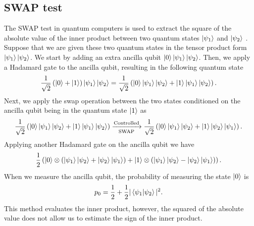 \documentclass[10pt]{article}
\begin{document}
	\subsection{\label{app: swap}SWAP test}
	The SWAP test in quantum computers is used to extract the square of the absolute value of the inner product between two quantum states $\ket{\psi_1}$ and $\ket{\psi_2}$ \citep{Schuld2021QML}. Suppose that we are given these two quantum states in the tensor product form $\ket{\psi_1}\ket{\psi_2}$. We start by adding an extra ancilla qubit $\ket{0}\ket{\psi_1}\ket{\psi_2}$. Then, we apply a Hadamard gate to the ancilla qubit, resulting in the following quantum state
	\begin{equation}
		\frac{1}{\sqrt{2}}\left(\ket{0}+\ket{1}\right)\ket{\psi_1}\ket{\psi_2}=\frac{1}{\sqrt{2}}\left(\ket{0}\ket{\psi_1}\ket{\psi_2}+\ket{1}\ket{\psi_1}\ket{\psi_2}\right).
	\end{equation}
	Next, we apply the swap operation between the two states conditioned on the ancilla qubit being in the quantum state $\ket{1}$ as
	\begin{equation}
		\frac{1}{\sqrt{2}}\left(\ket{0}\ket{\psi_1}\ket{\psi_2}+\ket{1}\ket{\psi_1}\ket{\psi_2}\right) \xrightarrow[\text{SWAP}]{\text{Controlled}}     \frac{1}{\sqrt{2}}\left(\ket{0}\ket{\psi_1}\ket{\psi_2}+\ket{1}\ket{\psi_2}\ket{\psi_1}\right) .
	\end{equation}
	Applying another Hadamard gate on the ancilla qubit we have
	\begin{equation}
		\frac{1}{2}\left(\ket{0}\otimes\left(\ket{\psi_1}\ket{\psi_2}+\ket{\psi_2}\ket{\psi_1}\right)+\ket{1}\otimes\left(\ket{\psi_1}\ket{\psi_2}-\ket{\psi_2}\ket{\psi_1}\right)\right).
	\end{equation}
	When we measure the ancilla qubit, the probability of measuring the state $\ket{0}$ is
	\begin{equation}
		p_{0}=\frac{1}{2}+\frac{1}{2}|\braket{\psi_1|\psi_2}|^{2}.
	\end{equation}
	This method evaluates the inner product, however, the squared of the absolute value does not allow us to estimate the sign of the inner product.
	
	
	
\end{document}
